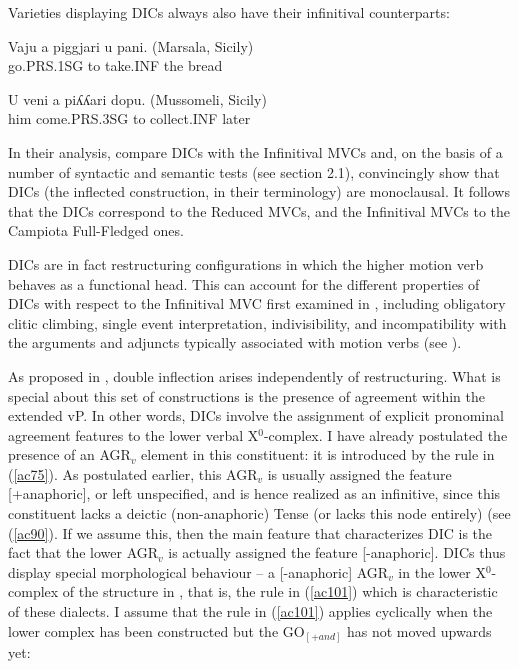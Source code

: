 \documentclass[output=paper]{langscibook}
\begin{document}
Varieties displaying DICs always also have their infinitival counterparts:

\ea \label{ac99}\gll Vaju    a  piggjari u     pani.    (Marsala, Sicily)\\
go.PRS.1SG to  take.INF the    bread \\
\z
   
\ea \label{ac100}\gll U   veni      a   piʎʎari   dopu.   (Mussomeli, Sicily)\\
him  come.PRS.3SG to   collect.INF later\\
\z

In their analysis, \cite{cardinaletti2001a} compare DICs with the Infinitival MVCs and, on the basis of a number of syntactic and semantic tests (see section 2.1), convincingly show that DICs (the inflected construction, in their terminology) are monoclausal. It follows that the DICs correspond to the Reduced MVCs, and the Infinitival MVCs to the Campiota Full-Fledged ones.

DICs are in fact restructuring configurations in which the higher motion verb behaves as a functional head. This can account for the different properties of DICs with respect to the Infinitival MVC first examined in \cite{cardinaletti2001a}, including obligatory clitic climbing, single event interpretation, indivisibility, and incompatibility with the arguments and adjuncts typically associated with motion verbs (see \cite{cardinaletti2001a, cardinaletti2003a, manzini2005a, cruschina2013a, caro2019a}). 

As proposed in \cite{cruschina2021a}, double inflection arises independently of restructuring. What is special about this set of constructions is the presence of agreement within the extended vP. In other words, DICs involve the assignment of explicit pronominal agreement features to the lower verbal X$^0$-complex. I have already postulated the presence of an  AGR$_v$ element in this constituent: it is introduced by the rule in (\ref{ac75}).  As postulated earlier, this AGR$_v$ is usually assigned the feature [+anaphoric], or left unspecified, and is hence realized as an infinitive, since this constituent lacks a deictic (non-anaphoric) Tense (or lacks this node entirely) (see (\ref{ac90}). If we assume this, then the main feature that characterizes DIC is the fact that the lower AGR$_v$ is actually assigned the feature [-anaphoric]. DICs thus display special morphological behaviour  --  a [-anaphoric] AGR$_v$ in the lower X$^0$-complex of the structure in , that is, the rule in (\ref{ac101}) which is characteristic of these dialects. I assume that the rule in (\ref{ac101}) applies cyclically when the lower complex has been constructed but the GO$_{[+and]}$ has not moved upwards yet:
 
\end{document}
